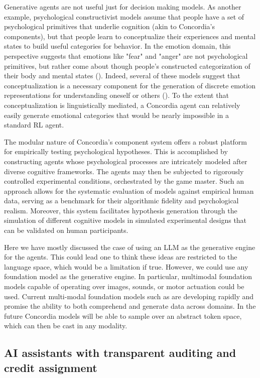 \documentclass[11pt, a4paper, logo, twocolumn, internal, copyright, numbering]{googledeepmind}
\begin{document}
Generative agents are not useful just for decision making models. As another example, psychological constructivist models assume that people have a set of psychological primitives that underlie cognition (akin to Concordia's components), but that people learn to conceptualize their experiences and mental states to build useful categories for behavior. In the emotion domain, this perspective suggests that emotions like "fear" and "anger" are not psychological primitives, but rather come about though people's constructed categorization of their body and mental states (\cite{barrett2006emotions}). Indeed, several of these models suggest that conceptualization is a necessary component for the generation of discrete emotion representations for understanding oneself or others (\cite{barrett2014conceptual}). To the extent that conceptualization is linguistically mediated, a Concordia agent can relatively easily generate emotional categories that would be nearly impossible in a standard RL agent. 

The modular nature of Concordia's component system offers a robust platform for empirically testing psychological hypotheses. This is accomplished by constructing agents whose psychological processes are intricately modeled after diverse cognitive frameworks. The agents may then be subjected to rigorously controlled experimental conditions, orchestrated by the game master. Such an approach allows for the systematic evaluation of models against empirical human data, serving as a benchmark for their algorithmic fidelity and psychological realism. Moreover, this system facilitates hypothesis generation through the simulation of different cognitive models in simulated experimental designs that can be validated on human participants. 

Here we have mostly discussed the case of using an LLM as the generative engine for the agents. This could lead one to think these ideas are restricted to the language space, which would be a limitation if true. However, we could use any foundation model as the generative engine. In particular, multimodal foundation models capable of operating over images, sounds, or motor actuation could be used. Current multi-modal foundation models such as \cite{li2023multimodal} are developing rapidly and promise the ability to both comprehend and generate data across domains. In the future Concordia models will be able to sample over an abstract token space, which can then be cast in any modality.


\subsection{AI assistants with transparent auditing and credit assignment}\label{section:auditing}
\end{document}
